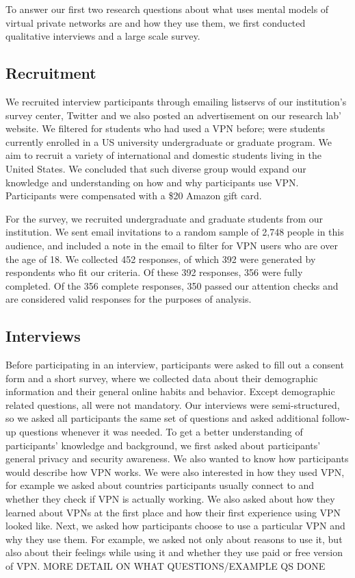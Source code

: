 To answer our first two research questions about  what uses mental models of virtual private networks are and how they use them,  we first conducted qualitative
interviews and a large scale survey. 

\subsection{Recruitment} We recruited interview participants through
emailing listservs of our institution's survey center, Twitter and we also
posted an advertisement on  our research lab' website. We filtered for students who had used a VPN before; were students currently enrolled in a US university undergraduate or graduate program.  We aim to recruit a variety of international and domestic students living in the United States.
We concluded that such diverse group would expand our knowledge and
understanding on how and why participants use VPN. Participants were compensated with a \$20 Amazon gift card.

For the survey, we recruited undergraduate and
graduate students from our institution. We sent email invitations to a random sample of 2,748 people in this
audience, and included a note in the email to filter for VPN users who are
over the age of 18. We collected 452 responses, of which 392 were generated by
respondents who fit our criteria. Of these 392 responses, 356 were fully
completed. Of the 356 complete responses, 350 passed our attention checks and
are considered valid responses for the purposes of analysis.

\subsection{Interviews} Before participating in an interview, participants were asked to fill
out a consent form and a short survey,
where we collected data about their demographic information and their general online habits and behavior. Except demographic related questions, all were not mandatory.
Our interviews were semi-structured, so we asked all participants the same set of questions and asked additional follow-up questions whenever it was needed. To get a better understanding of participants' knowledge and background, we  first asked  about participants' general privacy and security awareness. We also wanted to know how participants would describe how VPN works. We were also interested in how they used VPN, for example we asked about countries participants usually connect to and whether they check if VPN is actually working. We also asked about how they learned about VPNs at the first place and how their first experience using VPN looked like. Next, we asked how  participants choose to use a particular VPN and why they use them. For example, we asked not only about reasons to use it, but also about their feelings while using it and whether they use paid or free version of VPN.
 MORE DETAIL ON WHAT QUESTIONS/EXAMPLE QS DONE
 
